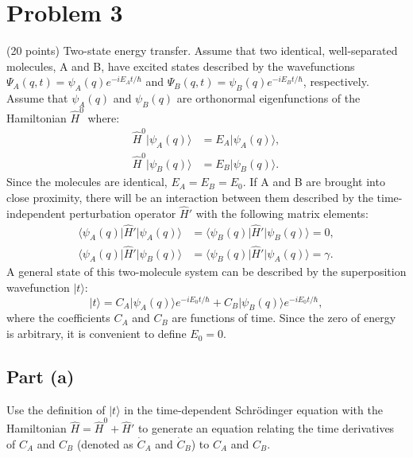 \documentclass{article}
\begin{document}
\section{Problem 3}
(20 points) Two-state energy transfer. Assume that two identical, well-separated molecules, A and B, have excited states described by the wavefunctions \(\Psi_A(q, t) = \psi_A(q)e^{-iE_At/\hbar}\) and \(\Psi_B(q, t) = \psi_B(q)e^{-iE_Bt/\hbar}\), respectively. Assume that \(\psi_A(q)\) and \(\psi_B(q)\) are orthonormal eigenfunctions of the Hamiltonian \(\hat{H}^0\) where:
\begin{align*}
\hat{H}^0 \lvert \psi_A(q) \rangle &= E_A \lvert \psi_A(q) \rangle, \\
\hat{H}^0 \lvert \psi_B(q) \rangle &= E_B \lvert \psi_B(q) \rangle.
\end{align*}
Since the molecules are identical, \(E_A = E_B = E_0\). If A and B are brought into close proximity, there will be an interaction between them described by the time-independent perturbation operator \(\hat{H}'\) with the following matrix elements:
\begin{align*}
\langle \psi_A(q) \lvert \hat{H}' \lvert \psi_A(q) \rangle &= \langle \psi_B(q) \lvert \hat{H}' \lvert \psi_B(q) \rangle = 0, \\
\langle \psi_A(q) \lvert \hat{H}' \lvert \psi_B(q) \rangle &= \langle \psi_B(q) \lvert \hat{H}' \lvert \psi_A(q) \rangle = \gamma.
\end{align*}
A general state of this two-molecule system can be described by the superposition wavefunction \( \lvert t \rangle \):
\[
\lvert t \rangle = C_A \lvert \psi_A(q) \rangle e^{-iE_0t/\hbar} + C_B \lvert \psi_B(q) \rangle e^{-iE_0t/\hbar},
\]
where the coefficients \(C_A\) and \(C_B\) are functions of time. Since the zero of energy is arbitrary, it is convenient to define \(E_0 = 0\).

\subsection{Part (a)}
Use the definition of \( \lvert t \rangle \) in the time-dependent Schrödinger equation with the Hamiltonian \( \hat{H} = \hat{H}^0 + \hat{H}' \) to generate an equation relating the time derivatives of \( C_A \) and \( C_B \) (denoted as \( \dot{C}_A \) and \( \dot{C}_B \)) to \( C_A \) and \( C_B \).
\end{document}
